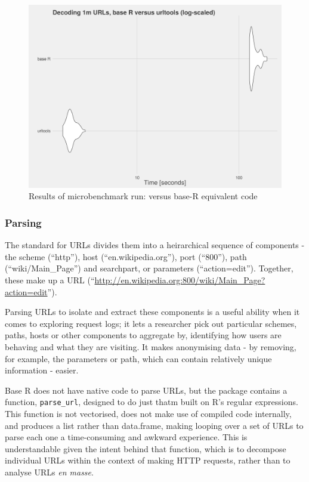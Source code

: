 \begin{figure}[h]
    \centering
    \includegraphics[scale=0.4]{decoding_benchmarks}
    \caption{Results of microbenchmark run:  versus base-R equivalent code}
\end{figure}

\subsubsection{Parsing}\label{parsing}

The standard for URLs \citep{RFC1738} divides them into a heirarchical
sequence of components - the scheme (``http''), host
(``en.wikipedia.org''), port (``800''), path (``wiki/Main\_Page'') and
searchpart, or parameters (``action=edit''). Together, these make up a
URL (``\url{http://en.wikipedia.org:800/wiki/Main_Page?action=edit}'').

Parsing URLs to isolate and extract these components is a useful ability
when it comes to exploring request logs; it lets a researcher pick out
particular schemes, paths, hosts or other components to aggregate by,
identifying how users are behaving and what they are visiting. It makes
anonymising data - by removing, for example, the parameters or path,
which can contain relatively unique information - easier.

Base R does not have native code to parse URLs, but the 
package \citep{httr} contains a function, \texttt{parse\_url}, designed
to do just thatm built on R's regular expressions. This function is not
vectorised, does not make use of compiled code internally, and produces
a list rather than data.frame, making looping over a set of URLs to
parse each one a time-consuming and awkward experience. This is
understandable given the intent behind that function, which is to
decompose individual URLs within the context of making HTTP requests,
rather than to analyse URLs \emph{en masse}.

